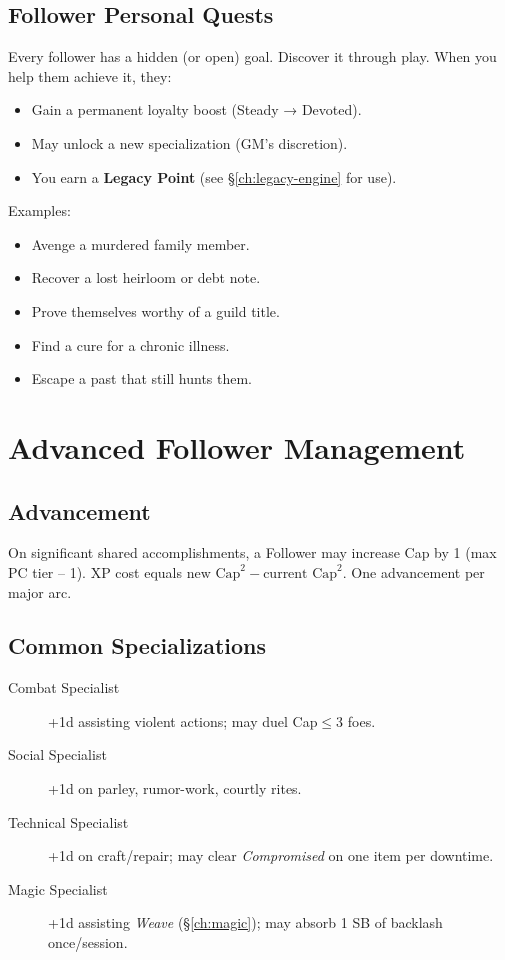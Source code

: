 \subsection*{Follower Personal Quests}
Every follower has a hidden (or open) goal. Discover it through play. When you help them achieve it, they:
\begin{itemize}
  \item Gain a permanent loyalty boost (Steady → Devoted).
  \item May unlock a new specialization (GM’s discretion).
  \item You earn a \textbf{Legacy Point} (see \S\ref{ch:legacy-engine} for use).
\end{itemize}
Examples:
\begin{itemize}
  \item Avenge a murdered family member.
  \item Recover a lost heirloom or debt note.
  \item Prove themselves worthy of a guild title.
  \item Find a cure for a chronic illness.
  \item Escape a past that still hunts them.
\end{itemize}

\section{Advanced Follower Management}

\subsection*{Advancement}
On significant shared accomplishments, a Follower may increase Cap by 1 (max PC tier – 1). XP cost equals \(\text{new Cap}^2 - \text{current Cap}^2\). One advancement per major arc.

\subsection*{Common Specializations}
\begin{description}
  \item[Combat Specialist] +1d assisting violent actions; may duel Cap\(\leq\)3 foes.
  \item[Social Specialist] +1d on parley, rumor-work, courtly rites.
  \item[Technical Specialist] +1d on craft/repair; may clear \emph{Compromised} on one item per downtime.
  \item[Magic Specialist] +1d assisting \emph{Weave} (\S\ref{ch:magic}); may absorb 1 SB of backlash once/session. 
\end{description}

